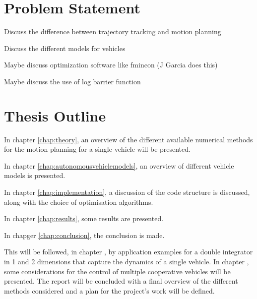 \section{Problem Statement}



\par Discuss the difference between trajectory tracking and motion planning
\par Discuss the different models for vehicles
\par Maybe discuss optimization software like fmincon (J Garcia does this)
\par Maybe discuss the use of log barrier function



\section{Thesis Outline}


\par In chapter \ref{chap:theory}, an overview of the different available numerical methods for the motion planning for a single vehicle will be presented. 
\par In chapter \ref{chap:autonomousvehiclemodels}, an overview of different vehicle models is presented. 
\par In chapter \ref{chap:implementation}, a discussion of the code structure is discussed, along with the choice of optimisation algorithms. 
\par In chapter \ref{chap:results}, some results are presented. 
\par In chapger \ref{chap:conclusion}, the conclusion is made. 

This will be followed, in chapter , by application examples for a double integrator in 1 and 2 dimensions that capture the dynamics of a single vehicle. In chapter , some considerations for the control of multiple cooperative vehicles will be presented. The report will be concluded with a final overview of the different methods considered and a plan for the project's work will be defined.
